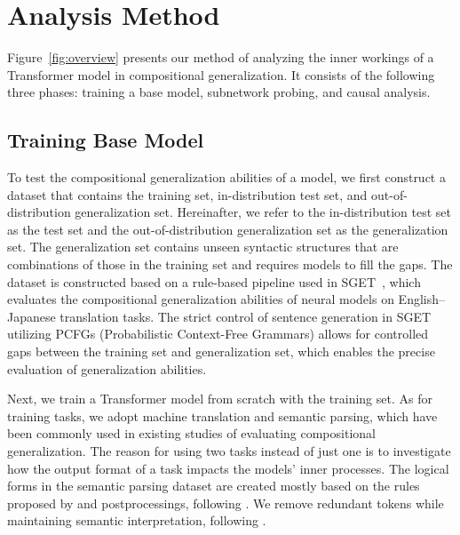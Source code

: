 
\section{Analysis Method}
\label{sec:method}

Figure~\ref{fig:overview} presents our method of analyzing the inner workings of a Transformer model in compositional generalization.
It consists of the following three phases:
training a base model, subnetwork probing, and causal analysis.

\subsection{Training Base Model}
\label{subsec:training}
To test the compositional generalization abilities of a model, we first construct a dataset that contains the training set, in-distribution test set, and out-of-distribution generalization set.
Hereinafter, we refer to the in-distribution test set as the test set and the out-of-distribution generalization set as the generalization set.
The generalization set contains unseen syntactic structures that are combinations of those in the training set and requires models to fill the gaps.
The dataset is constructed based on a rule-based pipeline used in SGET~\citep{kumon-etal-2024-evaluating}, which evaluates the compositional generalization abilities of neural models on English--Japanese translation tasks.
The strict control of sentence generation in SGET utilizing PCFGs (Probabilistic Context-Free Grammars) allows for controlled gaps between the training set and generalization set, which enables the precise evaluation of generalization abilities.

Next, we train a Transformer model from scratch with the training set.
As for training tasks, we adopt machine translation and semantic parsing, which have been commonly used in existing studies of evaluating compositional generalization.
The reason for using two tasks instead of just one is to investigate how the output format of a task impacts the models' inner processes.
The logical forms in the semantic parsing dataset are created mostly based on the rules proposed by \citet{reddy-etal-2017-universal} and postprocessings, following \citet{kim-linzen-2020-cogs}.
We remove redundant tokens while maintaining semantic interpretation, following \citet{wu-etal-2023-recogs}.

